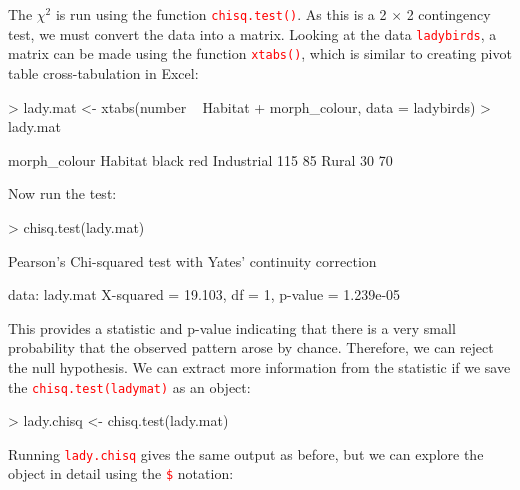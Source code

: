 \documentclass[a4paper,12pt]{article}
\newcommand\code[1]{\textcolor{red}{\texttt{#1}}}
\begin{document}
The $\chi^{2}$ is run using the function \code{chisq.test()}. As this is a 2 $\times$ 2 contingency test, we must convert the data into a matrix. Looking at the data \code{ladybirds}, a matrix can be made using the function \code{xtabs()}, which is similar to creating pivot table cross-tabulation in Excel:

\begin{shaded}
\begin{Schunk}
\begin{Sinput}
> lady.mat <- xtabs(number ~ Habitat + morph_colour, data = ladybirds)
> lady.mat
\end{Sinput}
\begin{Soutput}
            morph_colour
Habitat      black red
  Industrial   115  85
  Rural         30  70
\end{Soutput}
\end{Schunk}
\end{shaded}

Now run the test:

\begin{shaded}
\begin{Schunk}
\begin{Sinput}
> chisq.test(lady.mat)
\end{Sinput}
\begin{Soutput}
	Pearson's Chi-squared test with Yates' continuity correction

data:  lady.mat
X-squared = 19.103, df = 1, p-value = 1.239e-05
\end{Soutput}
\end{Schunk}
\end{shaded}


This provides a statistic and p-value indicating that there is a very small probability that the observed pattern arose by chance. Therefore, we can reject the null hypothesis. We can extract more information from the statistic if we save the \code{chisq.test(ladymat)} as an object:

\begin{shaded}
\begin{Schunk}
\begin{Sinput}
> lady.chisq <- chisq.test(lady.mat)
\end{Sinput}
\end{Schunk}
\end{shaded}

Running \code{lady.chisq} gives the same output as before, but we can explore the object in detail using the \code{\$} notation:
\end{document}
